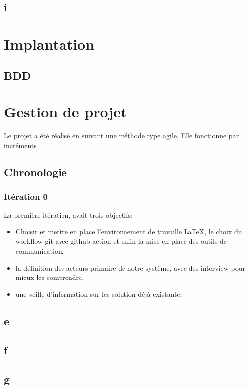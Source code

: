 \documentclass[a4paper,french,final]{memoir}
\begin{document}
\section{i}
\chapter{Implantation}\label{chapImplantation}
\section{BDD}
\chapter{Gestion de projet}\label{chapGestProjet}
Le projet a été réalisé en suivant une méthode type agile. Elle fonctionne par incréments 
\section{Chronologie}
\subsection{Itération 0}
La première itération, avait trois objectifs:
\begin{itemize}[label=]
    \item Choisir et mettre en place l'environnement de travaille \LaTeX, le choix du workflow git avec github action et enfin la mise en place des outils de communication.
    \item la définition des acteurs primaire de notre système, avec des interview pour mieux les comprendre.
    \item une veille d'information sur les solution déjà existante.
\end{itemize}

\section{e}
\section{f}
\section{g}
\appendixpage
\appendix

\backmatter
\end{document}
